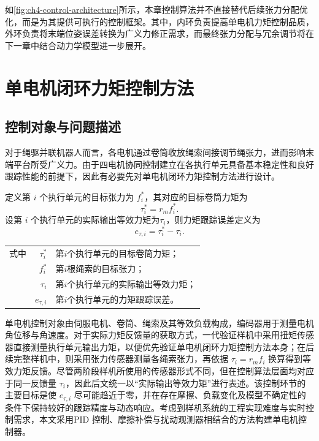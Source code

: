 如\cref{fig:ch4-control-architecture}所示，本章控制算法并不直接替代后续张力分配优化，而是为其提供可执行的控制框架。其中，内环负责提高单电机力矩控制品质，外环负责将末端位姿误差转换为广义力修正需求，而最终张力分配与冗余调节将在下一章中结合动力学模型进一步展开。

\section{单电机闭环力矩控制方法}

\subsection{控制对象与问题描述}

对于绳驱并联机器人而言，各电机通过卷筒收放绳索间接调节绳张力，进而影响末端平台所受广义力。由于四电机协同控制建立在各执行单元具备基本稳定性和良好跟踪性能的前提下，因此有必要先对单电机闭环力矩控制方法进行设计。

定义第 $i$ 个执行单元的目标张力为 $f_i^\ast$，其对应的目标卷筒力矩为
\begin{equation}
  \tau_i^\ast=r_m f_i^\ast. \label{eq:ch4-tau-ref-basic}
\end{equation}
设第 $i$ 个执行单元的实际输出等效力矩为$\tau_i$，则力矩跟踪误差定义为
\begin{equation}
  e_{\tau,i}=\tau_i^\ast-\tau_i. \label{eq:ch4-etau}
\end{equation}
\begin{tabularx}{\textwidth}{@{}l@{\quad}r@{———}X@{}}
  式中 & $\tau_i^\ast$ & 第$i$个执行单元的目标卷筒力矩；\\
       & $f_i^\ast$ & 第$i$根绳索的目标张力；\\
       & $\tau_i$ & 第$i$个执行单元的实际输出等效力矩；\\
       & $e_{\tau,i}$ & 第$i$个执行单元的力矩跟踪误差。
\end{tabularx}

单电机控制对象由伺服电机、卷筒、绳索及其等效负载构成，编码器用于测量电机角位移与角速度。对于实际力矩反馈量的获取方式，一代验证样机中采用扭矩传感器直接测量执行单元输出力矩，以便优先验证单电机闭环力矩控制方法本身；在后续完整样机中，则采用张力传感器测量各绳索张力，再依据 $\tau_i=r_m f_i$ 换算得到等效力矩反馈。尽管两阶段样机所使用的传感器形式不同，但在控制算法层面均对应于同一反馈量 $\tau_i$，因此后文统一以“实际输出等效力矩”进行表述。该控制环节的主要目标是使 $e_{\tau,i}$ 尽可能趋近于零，并在存在摩擦、负载变化及模型不确定性的条件下保持较好的跟踪精度与动态响应。考虑到样机系统的工程实现难度与实时控制需求，本文采用PID 控制、摩擦补偿与扰动观测器相结合的方法构建单电机控制器。

